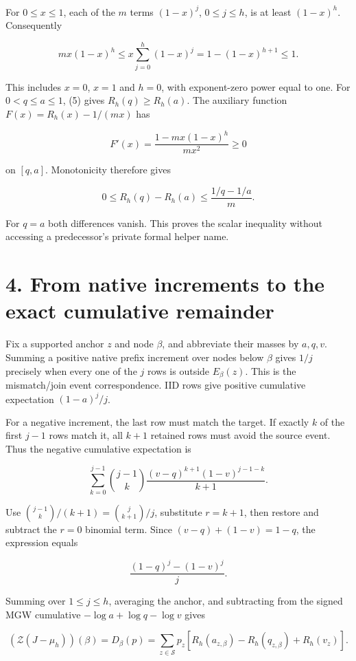 \documentclass[11pt,a4paper]{article}
\begin{document}
For \(0\le x\le1\), each of the \(m\) terms \((1-x)^j\), \(0\le j\le h\), is at least \((1-x)^h\). Consequently

\[
m x(1-x)^h\le x\sum_{j=0}^h(1-x)^j
=1-(1-x)^{h+1}\le1. \tag{6}
\]

This includes \(x=0\), \(x=1\) and \(h=0\), with exponent-zero power equal to one. For \(0<q\le a\le1\), (5) gives \(R_h(q)\ge R_h(a)\). The auxiliary function \(F(x)=R_h(x)-1/(mx)\) has

\[
F'(x)=\frac{1-mx(1-x)^h}{mx^2}\ge0
\]

on \([q,a]\). Monotonicity therefore gives

\[
0\le R_h(q)-R_h(a)\le\frac{1/q-1/a}{m}. \tag{7}
\]

For \(q=a\) both differences vanish. This proves the scalar inequality without accessing a predecessor's private formal helper name.

\section{4. From native increments to the exact cumulative remainder}\label{from-native-increments-to-the-exact-cumulative-remainder}

Fix a supported anchor \(z\) and node \(\beta\), and abbreviate their masses by \(a,q,v\). Summing a positive native prefix increment over nodes below \(\beta\) gives \(1/j\) precisely when every one of the \(j\) rows is outside \(E_\beta(z)\). This is the mismatch/join event correspondence. IID rows give positive cumulative expectation \((1-a)^j/j\).

For a negative increment, the last row must match the target. If exactly \(k\) of the first \(j-1\) rows match it, all \(k+1\) retained rows must avoid the source event. Thus the negative cumulative expectation is

\[
\sum_{k=0}^{j-1}\binom{j-1}{k}
 \frac{(v-q)^{k+1}(1-v)^{j-1-k}}{k+1}.
\]

Use \(\binom{j-1}k/(k+1)=\binom j{k+1}/j\), substitute \(r=k+1\), then restore and subtract the \(r=0\) binomial term. Since \((v-q)+(1-v)=1-q\), the expression equals

\[
\frac{(1-q)^j-(1-v)^j}{j}. \tag{8}
\]

Summing over \(1\le j\le h\), averaging the anchor, and subtracting from the signed MGW cumulative \(-\log a+\log q-\log v\) gives

\[
(\mathcal Z(J-\mu_h))(\beta)=D_\beta(p)
=\sum_{z\in\mathcal S}p_z
 [R_h(a_{z,\beta})-R_h(q_{z,\beta})+R_h(v_z)]. \tag{9}
\]
\end{document}
